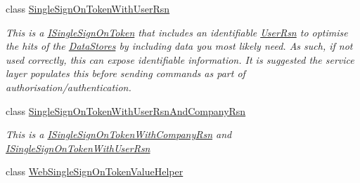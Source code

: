 \begin{DoxyCompactItemize}
class \hyperlink{classCqrs_1_1Authentication_1_1SingleSignOnTokenWithUserRsn}{Single\+Sign\+On\+Token\+With\+User\+Rsn}
\begin{DoxyCompactList}\small\item\em This is a \hyperlink{interfaceCqrs_1_1Authentication_1_1ISingleSignOnToken}{I\+Single\+Sign\+On\+Token} that includes an identifiable \hyperlink{classCqrs_1_1Authentication_1_1SingleSignOnTokenWithUserRsn_a47d20dd286cf61cc23028e75cddcca79_a47d20dd286cf61cc23028e75cddcca79}{User\+Rsn} to optimise the hits of the \hyperlink{}{Data\+Stores} by including data you most likely need. As such, if not used correctly, this can expose identifiable information. It is suggested the service layer populates this before sending commands as part of authorisation/authentication. \end{DoxyCompactList}\item 
class \hyperlink{classCqrs_1_1Authentication_1_1SingleSignOnTokenWithUserRsnAndCompanyRsn}{Single\+Sign\+On\+Token\+With\+User\+Rsn\+And\+Company\+Rsn}
\begin{DoxyCompactList}\small\item\em This is a \hyperlink{interfaceCqrs_1_1Authentication_1_1ISingleSignOnTokenWithCompanyRsn}{I\+Single\+Sign\+On\+Token\+With\+Company\+Rsn} and \hyperlink{interfaceCqrs_1_1Authentication_1_1ISingleSignOnTokenWithUserRsn}{I\+Single\+Sign\+On\+Token\+With\+User\+Rsn} \end{DoxyCompactList}\item 
class \hyperlink{classCqrs_1_1Authentication_1_1WebSingleSignOnTokenValueHelper}{Web\+Single\+Sign\+On\+Token\+Value\+Helper}
\end{DoxyCompactItemize}
